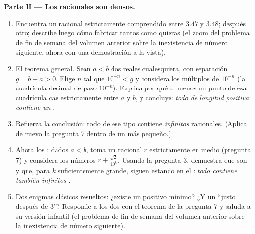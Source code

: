 \begin{problem}
\medskip
\noindent\textbf{Parte II --- Los racionales son densos.}
\begin{enumerate}[resume]
  \item Encuentra un racional estrictamente comprendido entre $3.47$ y
        $3.48$; después otro; describe luego cómo fabricar tantos como
        quieras (el zoom del problema de fin de semana del volumen
        anterior sobre la inexistencia de número siguiente, ahora con una
        demostración a la vista).
  \item El teorema general. Sean $a < b$ dos reales cualesquiera, con
        separación $g = b - a > 0$. Elige $n$ tal que $10^{-n} < g$ y
        considera los múltiplos de $10^{-n}$ (la cuadrícula decimal de
        paso $10^{-n}$). Explica por qué al menos un punto de esa
        cuadrícula cae estrictamente entre $a$ y $b$, y concluye:
        \emph{todo  de longitud positiva contiene un }.
  \item Refuerza la conclusión: todo  de ese tipo contiene
        \emph{infinitos} racionales. (Aplica de nuevo la pregunta 7 dentro
        de un  más pequeño.)
  \item Ahora los : dados $a < b$, toma un racional $r$
        estrictamente en medio (pregunta 7) y considera los números
        $r + \frac{\sqrt2}{10^k}$. Usando la pregunta 3, demuestra que son
         y que, para $k$ suficientemente grande, siguen
        estando en el : \emph{todo  contiene también
        infinitos }.
  \item Dos enigmas clásicos resueltos: ¿existe un  positivo
        mínimo? ¿Y un  ``justo después de $3$''? Responde a los
        dos con el teorema de la pregunta 7 y saluda a su versión infantil
        (el problema de fin de semana del volumen anterior sobre la
        inexistencia de número siguiente).
\end{enumerate}


\end{problem}
